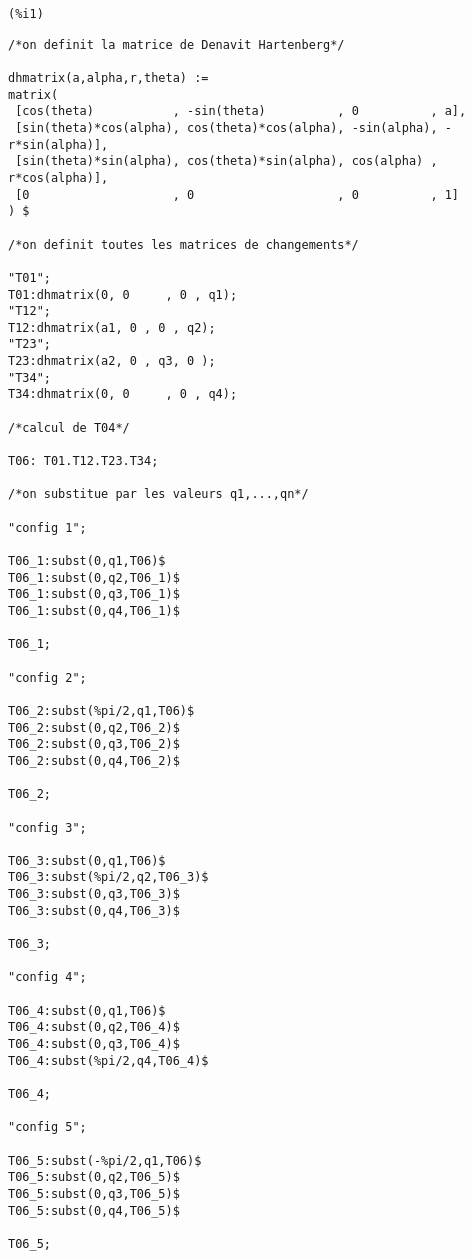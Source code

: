 \documentclass{article}
\begin{document}
\noindent
\begin{minipage}[t]{8ex}{\color{red}\bf
\begin{verbatim}
(%i1) 
\end{verbatim}}
\end{minipage}
\begin{minipage}[t]{\textwidth}{\color{blue}
\begin{verbatim}
/*on definit la matrice de Denavit Hartenberg*/

dhmatrix(a,alpha,r,theta) :=
matrix(
 [cos(theta)           , -sin(theta)          , 0          , a], 
 [sin(theta)*cos(alpha), cos(theta)*cos(alpha), -sin(alpha), -r*sin(alpha)], 
 [sin(theta)*sin(alpha), cos(theta)*sin(alpha), cos(alpha) , r*cos(alpha)], 
 [0                    , 0                    , 0          , 1]
) $

/*on definit toutes les matrices de changements*/

"T01";
T01:dhmatrix(0, 0     , 0 , q1);
"T12";
T12:dhmatrix(a1, 0 , 0 , q2);
"T23";
T23:dhmatrix(a2, 0 , q3, 0 );
"T34";
T34:dhmatrix(0, 0     , 0 , q4);

/*calcul de T04*/

T06: T01.T12.T23.T34;

/*on substitue par les valeurs q1,...,qn*/

"config 1";

T06_1:subst(0,q1,T06)$
T06_1:subst(0,q2,T06_1)$
T06_1:subst(0,q3,T06_1)$
T06_1:subst(0,q4,T06_1)$

T06_1;

"config 2";

T06_2:subst(%pi/2,q1,T06)$
T06_2:subst(0,q2,T06_2)$
T06_2:subst(0,q3,T06_2)$
T06_2:subst(0,q4,T06_2)$

T06_2;

"config 3";

T06_3:subst(0,q1,T06)$
T06_3:subst(%pi/2,q2,T06_3)$
T06_3:subst(0,q3,T06_3)$
T06_3:subst(0,q4,T06_3)$

T06_3;

"config 4";

T06_4:subst(0,q1,T06)$
T06_4:subst(0,q2,T06_4)$
T06_4:subst(0,q3,T06_4)$
T06_4:subst(%pi/2,q4,T06_4)$

T06_4;

"config 5";

T06_5:subst(-%pi/2,q1,T06)$
T06_5:subst(0,q2,T06_5)$
T06_5:subst(0,q3,T06_5)$
T06_5:subst(0,q4,T06_5)$

T06_5;



\end{verbatim}}
\end{minipage}
\end{document}
